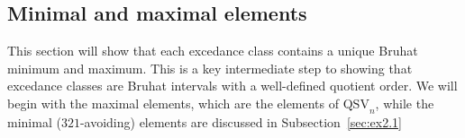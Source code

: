 \documentclass[12pt]{article}
\theoremstyle{definition}
\theoremstyle{remark}
\numberwithin{equation}{section}
\newcommand{\QSV}{\mathrm{QSV}}
\begin{document}
\subsection{Minimal and maximal elements}%
\label{sec:minmax}
\label{sec:ex2}

This section will show that each excedance class contains a unique Bruhat minimum and maximum.  
This is a key intermediate step to showing that excedance classes are Bruhat intervals with a well-defined quotient order.  
We will begin with the maximal elements, which are the elements of $\QSV_{n}$, while the minimal ($321$-avoiding) elements are discussed in Subsection~\ref{sec:ex2.1}
\end{document}
